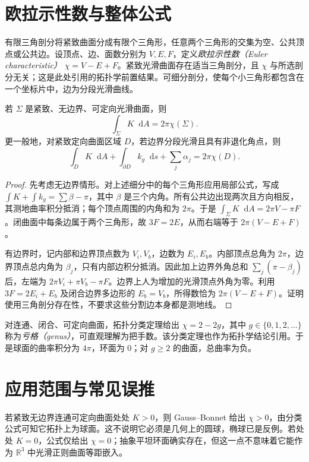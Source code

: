 \documentclass[UTF8,12pt,a4paper,fontset=fandol]{ctexbook}
\newcommand{\R}{\mathbb R}
\newcommand{\dd}{\mathop{}\!\mathrm d}
\begin{document}
\section{欧拉示性数与整体公式}
有限三角剖分将紧致曲面分成有限个三角形，任意两个三角形的交集为空、公共顶点或公共边。设顶点、边、面数分别为 $V,E,F$，定义\emph{欧拉示性数（Euler characteristic）} $\chi=V-E+F$。紧致光滑曲面存在适当三角剖分，且 $\chi$ 与所选剖分无关；这是此处引用的拓扑学前置结果。可细分剖分，使每个小三角形都包含在一个坐标片中，边为分段光滑曲线。

\begin{theorem}
若 $\Sigma$ 是紧致、无边界、可定向光滑曲面，则
\begin{equation}
 \int_\Sigma K\dd A=2\pi\chi(\Sigma).
 \label{eq:dg-global-gb}
\end{equation}
更一般地，对紧致定向曲面区域 $D$，若边界分段光滑且具有非退化角点，则
\begin{equation}
 \int_DK\dd A+\int_{\partial D}k_g\dd s+\sum_j\alpha_j
 =2\pi\chi(D).
 \label{eq:dg-boundary-gb}
\end{equation}
\label{thm:dg-global-gb}
\end{theorem}
\begin{proof}
先考虑无边界情形。对上述细分中的每个三角形应用局部公式，写成 $\int K+\int k_g=\sum\beta-\pi$，其中 $\beta$ 是三个内角。所有公共边出现两次且方向相反，其测地曲率积分抵消；每个顶点周围的内角和为 $2\pi$。于是 $\int_\Sigma K\dd A=2\pi V-\pi F$。闭曲面中每条边属于两个三角形，故 $3F=2E$，从而右端等于 $2\pi(V-E+F)$。

有边界时，记内部和边界顶点数为 $V_i,V_b$，边数为 $E_i,E_b$。内部顶点总角为 $2\pi$，边界顶点总内角为 $\beta_j$，只有内部边积分抵消。因此加上边界外角总和 $\sum_j(\pi-\beta_j)$ 后，左端为 $2\pi V_i+\pi V_b-\pi F$。边界上人为增加的光滑顶点外角为零。利用 $3F=2E_i+E_b$ 及闭合边界多边形的 $E_b=V_b$，所得数恰为 $2\pi(V-E+F)$。证明使用三角剖分存在性，不要求这些分割边本身都是测地线。
\end{proof}

对连通、闭合、可定向曲面，拓扑分类定理给出 $\chi=2-2g$，其中 $g\in\{0,1,2,\ldots\}$ 称为\emph{亏格（genus）}，可直观理解为把手数。该分类定理也作为拓扑学结论引用。于是球面的曲率积分为 $4\pi$，环面为 $0$；对 $g\ge2$ 的曲面，总曲率为负。

\section{应用范围与常见误推}
若紧致无边界连通可定向曲面处处 $K>0$，则 Gauss--Bonnet 给出 $\chi>0$，由分类公式可知它拓扑上为球面。这不说明它必须是几何上的圆球，椭球已是反例。若处处 $K=0$，公式仅给出 $\chi=0$；抽象平坦环面确实存在，但这一点不意味着它能作为 $\R^3$ 中光滑正则曲面等距嵌入。
\end{document}
